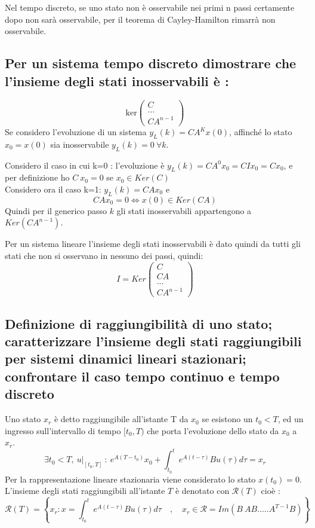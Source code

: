 \documentclass{article}
\begin{document}
Nel tempo discreto, se uno stato non è osservabile nei primi n passi certamente dopo non sarà osservabile,
per il teorema di Cayley-Hamilton rimarrà non osservabile.



\subsection{Per un sistema tempo discreto dimostrare che l'insieme degli stati inosservabili è :}
\[ \text{ker}\begin{pmatrix}C\\...\\CA^{n-1}\end{pmatrix}\]
Se considero l'evoluzione di un sistema $y_L(k)=CA^Kx(0)$, affinché lo stato $x_0 = x(0)$
sia inosservabile $y_L(k)=0\ \forall k$.

Considero il caso in cui k=0 :
l'evoluzione è  $y_L(k)=CA^0x_0=CIx_0=Cx_0$, e per definizione ho $C\ x_0=0$ se $x_0 \in Ker(C)$\\
Considero ora il caso k=1: $y_L(k)=CAx_0$ e 
\[
     CAx_0=0 \Longleftrightarrow x(0) \in Ker(CA)
\]
Quindi per il generico passo $k$ gli stati inosservabili appartengono a $Ker(CA^{n-1})$.

Per un sistema lineare l'insieme degli stati inosservabili è dato quindi da tutti gli stati
che non si osservano in nessuno dei passi, quindi: 
\[
    I=Ker \begin{pmatrix}C\\CA\\...\\CA^{n-1}\end{pmatrix}
\]







\subsection{Definizione di raggiungibilità di uno stato; caratterizzare l'insieme degli stati raggiungibili per sistemi dinamici lineari stazionari; confrontare il caso tempo continuo e tempo discreto}
Uno stato $x_r$ è detto raggiungibile all'istante T da $x_0$ se esistono un $t_0<T$, ed un ingresso sull'intervallo di tempo $[t_0,T)$
che porta l'evoluzione dello stato da $x_0$ a $x_r$.
\[ \exists t_0 < T,\ \left.u\right|_{[t_0,T]}\ :\ e^{A(T-t_0)}x_0+ \int_{t_0}^{t} e^{A(t-\tau)}Bu(\tau) d\tau = x_r \]
Per la rappresentazione lineare stazionaria viene considerato lo stato $x(t_0)=0$. 
L'insieme degli stati raggiungibili all'istante $T$ è denotato con $\mathcal{R}(T)$ cioè :
\[\mathcal{R}(T)=\left\{ x_r : x= \int_{t_0}^{t} e^{A(t-\tau)}Bu(\tau)d\tau
\quad, \quad
x_r \in \mathcal{R}=Im(B\ AB ..... A^{T-1}B) \right\} \]
\end{document}
